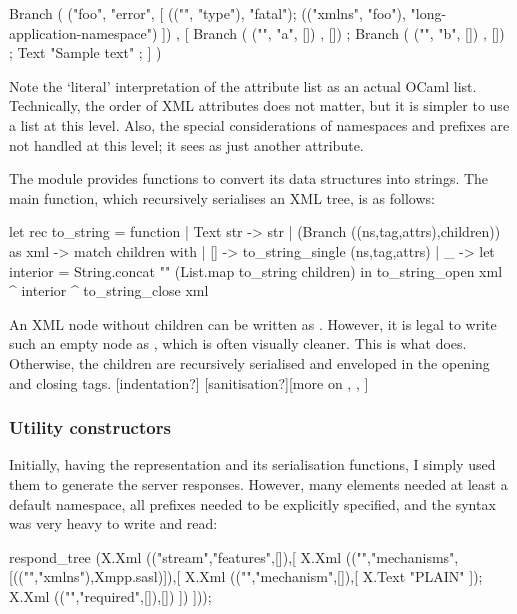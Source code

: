 \documentclass[12pt,a4paper,twoside,openright]{report}
\begin{document}
{\begin{ocaml}
Branch ( ("foo", "error", [
    (("", "type"), "fatal");
    (("xmlns", "foo"), "long-application-namespace")
  ]) , [
    Branch ( ("", "a", []) , []) ;
    Branch ( ("", "b", []) , []) ;
    Text "Sample text" ;
] )
\end{ocaml}

Note the `literal' interpretation of the attribute list as an actual OCaml list. Technically, the order of XML attributes does not matter, but it is simpler to use a list at this level. Also, the special considerations of namespaces and prefixes are not handled at this level; it sees  as just another attribute.

The  module provides functions to convert its data structures into strings. The main  function, which recursively serialises an XML tree, is as follows:

\begin{ocaml}
let rec to_string = function
  | Text str -> str
  | (Branch ((ns,tag,attrs),children)) as xml ->
    match children with
    | [] -> to_string_single (ns,tag,attrs)
    | _  -> let interior = String.concat "" (List.map to_string children) in
            to_string_open xml ^ interior ^ to_string_close xml
\end{ocaml}

An XML node without children can be written as . However, it is legal to write such an empty node as , which is often visually cleaner. This is what  does. Otherwise, the children are recursively serialised and enveloped in the opening and closing tags. [indentation?] [sanitisation?][more on , , ]

\subsubsection{Utility constructors}
Initially, having the  representation and its serialisation functions, I simply used them to generate the server responses. However, many elements needed at least a default namespace, all prefixes needed to be explicitly specified, and the syntax was very heavy to write and read:

\begin{ocaml}
respond_tree
  (X.Xml (("stream","features",[]),[
    X.Xml (("","mechanisms",[(("","xmlns"),Xmpp.sasl)]),[
        X.Xml (("","mechanism",[]),[ X.Text "PLAIN" ]);
        X.Xml (("","required",[]),[])
      ])
  ]));
\end{ocaml}

}
\end{document}
